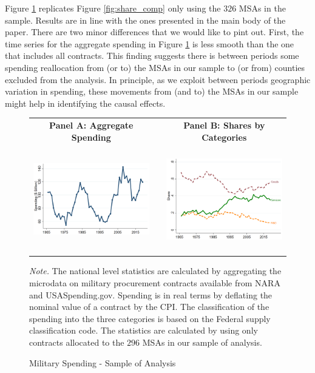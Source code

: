 \documentclass[dv_diss_main.tex]{subfiles}
\begin{document}
\newpage 
Figure \ref{fig:share_comp_sample} replicates Figure \ref{fig:share_comp} only using the $326$ MSAs in the sample. Results are in line with the ones presented in the main body of the paper. There are two minor differences that we would like to pint out. First, the time series for the aggregate spending in Figure \ref{fig:share_comp_sample} is less smooth than the one that includes all contracts. This finding suggests there is between periods some spending reallocation from (or to) the MSAs in our sample to (or from) counties excluded from the analysis. In principle, as we exploit between periods geographic variation in spending, these movements from (and to) the MSAs in our sample might help in identifying the causal effects. 

\begin{figure}[ht]
    \begin{center}
        \begin{tabular}[c]{ccc}
    
    \normalsize{\bf Panel A: Aggregate Spending} & & \normalsize{\bf Panel B: Shares by Categories} \\
    {\includegraphics[height=1.8in,width=2.9in]{figures/graph_milspend_aggregate_sample.png}} & & {\includegraphics[height=1.8in,width=2.9in]{figures/graph_composition_shares_sample.png}} \\[0.1in]
    
    
    
    \end{tabular}
    \end{center}
    
    \caption{Military Spending - Sample of Analysis}
    \footnotesize{\textit{Note. } The national level statistics are calculated by aggregating the microdata on military procurement contracts available from NARA and USASpending.gov. Spending is in real terms by deflating the nominal value of a contract by the CPI. The classification of the spending into the three categories is based on the Federal supply classification code. The statistics are calculated by using only contracts allocated to the $296$ MSAs in our sample of analysis.}
    \label{fig:share_comp_sample}
\end{figure}
\end{document}
